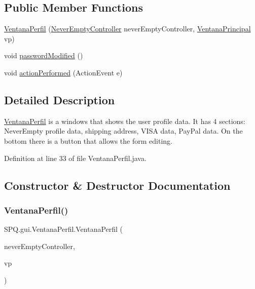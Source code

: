 \subsection*{Public Member Functions}
\begin{DoxyCompactItemize}
\item 
\mbox{\hyperlink{class_s_p_q_1_1gui_1_1_ventana_perfil_a16166538d7497a79cdc1e383ae852ac1}{Ventana\+Perfil}} (\mbox{\hyperlink{class_s_p_q_1_1controller_1_1_never_empty_controller}{Never\+Empty\+Controller}} never\+Empty\+Controller, \mbox{\hyperlink{class_s_p_q_1_1gui_1_1_ventana_principal}{Ventana\+Principal}} vp)
\item 
void \mbox{\hyperlink{class_s_p_q_1_1gui_1_1_ventana_perfil_a65b1807fdef3dcfdaf5564d2148fc46d}{password\+Modified}} ()
\item 
void \mbox{\hyperlink{class_s_p_q_1_1gui_1_1_ventana_perfil_ab3748a16025307c203ba1dd2c5385b23}{action\+Performed}} (Action\+Event e)
\end{DoxyCompactItemize}


\subsection{Detailed Description}
\mbox{\hyperlink{class_s_p_q_1_1gui_1_1_ventana_perfil}{Ventana\+Perfil}} is a windows that shows the user profile data. It has 4 sections\+: Never\+Empty profile data, shipping address, V\+I\+SA data, Pay\+Pal data. On the bottom there is a button that allows the form editing. 

Definition at line 33 of file Ventana\+Perfil.\+java.



\subsection{Constructor \& Destructor Documentation}
\mbox{\label{class_s_p_q_1_1gui_1_1_ventana_perfil_a16166538d7497a79cdc1e383ae852ac1}} 
\subsubsection{\texorpdfstring{Ventana\+Perfil()}{VentanaPerfil()}}
{\footnotesize\ttfamily S\+P\+Q.\+gui.\+Ventana\+Perfil.\+Ventana\+Perfil (\begin{DoxyParamCaption}\item[{\mbox{\hyperlink{class_s_p_q_1_1controller_1_1_never_empty_controller}{Never\+Empty\+Controller}}}]{never\+Empty\+Controller,  }\item[{\mbox{\hyperlink{class_s_p_q_1_1gui_1_1_ventana_principal}{Ventana\+Principal}}}]{vp }\end{DoxyParamCaption})}



